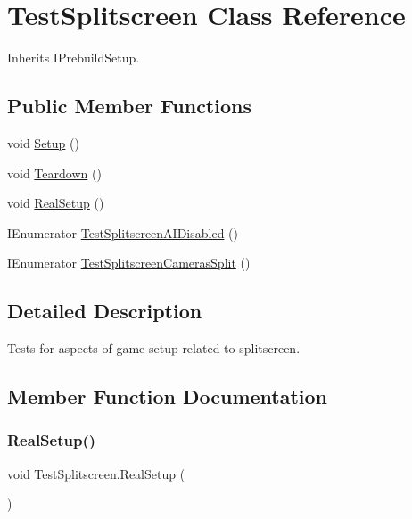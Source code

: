 \hypertarget{class_test_splitscreen}{}\section{Test\+Splitscreen Class Reference}
\label{class_test_splitscreen}


Inherits I\+Prebuild\+Setup.

\subsection*{Public Member Functions}
\begin{DoxyCompactItemize}
\item 
void \hyperlink{class_test_splitscreen_a2bbadc0dfb0f6e6475b20bea58cbe36e}{Setup} ()
\item 
void \hyperlink{class_test_splitscreen_ab0295bf280db9a3c4b638d8cf0d83cb2}{Teardown} ()
\item 
void \hyperlink{class_test_splitscreen_a879cc1a382656028ea140b4bed4e7f1b}{Real\+Setup} ()
\item 
I\+Enumerator \hyperlink{class_test_splitscreen_a24f4aefda2ea64efd8507bfa6e566253}{Test\+Splitscreen\+A\+I\+Disabled} ()
\item 
I\+Enumerator \hyperlink{class_test_splitscreen_ada07c146c9a8cc889e096f7de9e783c8}{Test\+Splitscreen\+Cameras\+Split} ()
\end{DoxyCompactItemize}


\subsection{Detailed Description}
Tests for aspects of game setup related to splitscreen. 



\subsection{Member Function Documentation}
\mbox{\label{class_test_splitscreen_a879cc1a382656028ea140b4bed4e7f1b}} 
\subsubsection{\texorpdfstring{Real\+Setup()}{RealSetup()}}
{\footnotesize\ttfamily void Test\+Splitscreen.\+Real\+Setup (\begin{DoxyParamCaption}{ }\end{DoxyParamCaption})}



